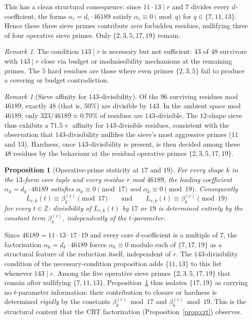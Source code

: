 \documentclass[11pt]{article}
\renewcommand{\_}{\origunderscore\allowbreak}
\newtheorem{proposition}[theorem]{Proposition}
\theoremstyle{definition}
\theoremstyle{remark}
\newtheorem{remark}[theorem]{Remark}
\begin{document}
This has a clean structural consequence: since $11\cdot 13\mid r$
and $7$ divides every $d$-coefficient, the forms
$\alpha_i=d_i\cdot 46189$ satisfy $\alpha_i\equiv 0\pmod{q}$ for
$q\in\{7,11,13\}$. Hence these three sieve primes contribute
\emph{zero} forbidden residues, nullifying three of four operative
sieve primes. Only $\{2,3,5,17,19\}$ remain.

\begin{remark}
The condition $143\mid r$ is necessary but not sufficient: $43$ of
$48$ survivors with $143\mid r$ close via budget or inadmissibility
mechanisms at the remaining primes. The $5$ hard residues are
those where even primes $\{2,3,5\}$ fail to produce a covering
or budget contradiction.
\end{remark}

\begin{remark}[Sieve affinity for $143$-divisibility]\label{rmk:sieve-affinity}
Of the $96$ surviving residues mod $46189$, exactly $48$ (that is,
$50\%$) are divisible by $143$. In the ambient space mod $46189$,
only $323/46189\approx 0.70\%$ of residues are $143$-divisible.
The $12$-shape sieve thus exhibits a $71.5\times$ affinity for
$143$-divisible residues, consistent with the observation that
$143$-divisibility nullifies the sieve's most aggressive primes
($11$ and $13$). Hardness, once $143$-divisibility is present,
is then decided among these $48$ residues by the behaviour at the
residual operative primes $\{2,3,5,17,19\}$.
\end{remark}

\begin{proposition}[Operative-prime staticity at $17$ and $19$]\label{prop:staticity}
For every shape $k$ in the $13$-form core tuple and every residue
$r$ mod $46189$, the leading coefficient $\alpha_k = d_k\cdot 46189$
satisfies $\alpha_k\equiv 0\pmod{17}$ and $\alpha_k\equiv 0\pmod{19}$.
Consequently
\[
  L_{r,k}(t)\equiv\beta_k^{(r)}\pmod{17}
  \qquad\text{and}\qquad
  L_{r,k}(t)\equiv\beta_k^{(r)}\pmod{19}
\]
for every $t\in\mathbb{Z}$: divisibility of $L_{r,k}(t)$ by $17$ or
$19$ is determined entirely by the constant term
$\beta_k^{(r)}$, independently of the $t$-parameter.
\end{proposition}

Since $46189 = 11\cdot 13\cdot 17\cdot 19$ and every core
$d$-coefficient is a multiple of $7$, the factorisation
$\alpha_k = d_k\cdot 46189$ forces $\alpha_k\equiv 0$ modulo each of
$\{7,17,19\}$ as a structural feature of the reduction itself,
independent of $r$. The $143$-divisibility condition of the
necessary-condition proposition adds $\{11,13\}$ to this list
whenever $143\mid r$. Among the five operative sieve primes
$\{2,3,5,17,19\}$ that remain after nullifying $\{7,11,13\}$,
Proposition~\ref{prop:staticity} thus isolates $\{17,19\}$ as
carrying no $t$-parameter information: their contribution to
closure or hardness is determined \emph{rigidly} by the constants
$\beta_k^{(r)}\bmod 17$ and $\beta_k^{(r)}\bmod 19$. This is the
structural content that the CRT factorization
(Proposition~\ref{prop:crt}) observes.
\end{document}
